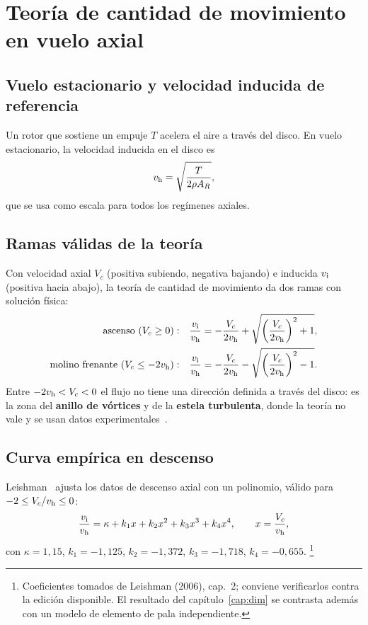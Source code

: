 \section{Teoría de cantidad de movimiento en vuelo axial}\label{sec:momento}

\subsection{Vuelo estacionario y velocidad inducida de referencia}
Un rotor que sostiene un empuje $T$ acelera el aire a través del disco. En vuelo
estacionario, la velocidad inducida en el disco es~\cite{leishman2006,johnson1980}
\begin{equation}
  v_{\mathrm{h}} = \sqrt{\frac{T}{2\rho A_R}} ,
  \label{eq:vh}
\end{equation}
que se usa como escala para todos los regímenes axiales.

\subsection{Ramas válidas de la teoría}
Con velocidad axial $V_c$ (positiva subiendo, negativa bajando) e inducida $v_{\mathrm{i}}$
(positiva hacia abajo), la teoría de cantidad de movimiento da dos ramas con solución
física:
\begin{align}
  \text{ascenso } (V_c \ge 0):&\quad \frac{v_{\mathrm{i}}}{v_{\mathrm{h}}} = -\frac{V_c}{2v_{\mathrm{h}}} +
      \sqrt{\left(\frac{V_c}{2v_{\mathrm{h}}}\right)^2 + 1},\label{eq:ascenso}\\
  \text{molino frenante } (V_c \le -2v_{\mathrm{h}}):&\quad \frac{v_{\mathrm{i}}}{v_{\mathrm{h}}} = -\frac{V_c}{2v_{\mathrm{h}}} -
      \sqrt{\left(\frac{V_c}{2v_{\mathrm{h}}}\right)^2 - 1}.\label{eq:molino}
\end{align}
Entre $-2v_{\mathrm{h}} < V_c < 0$ el flujo no tiene una dirección definida a través del disco: es
la zona del \textbf{anillo de vórtices} y de la \textbf{estela turbulenta}, donde la
teoría no vale y se usan datos experimentales~\cite{castles1951,johnson2005,leishman2004}.

\subsection{Curva empírica en descenso}
Leishman~\cite{leishman2006} ajusta los datos de descenso axial con un polinomio,
válido para $-2\le V_c/v_{\mathrm{h}}\le0$:
\begin{equation}
  \frac{v_{\mathrm{i}}}{v_{\mathrm{h}}} = \kappa + k_1 x + k_2 x^2 + k_3 x^3 + k_4 x^4, \qquad x=\frac{V_c}{v_{\mathrm{h}}},
  \label{eq:poly}
\end{equation}
con $\kappa=1{,}15$, $k_1=-1{,}125$, $k_2=-1{,}372$, $k_3=-1{,}718$, $k_4=-0{,}655$.%
\footnote{Coeficientes tomados de Leishman (2006), cap.~2; conviene verificarlos contra la
edición disponible. El resultado del capítulo~\ref{cap:dim} se contrasta además con un
modelo de elemento de pala independiente.}

